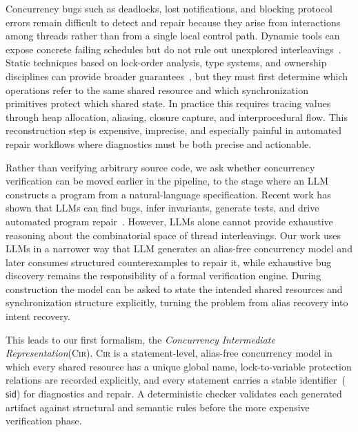 \documentclass{article}
\begin{document}
Concurrency bugs such as deadlocks, lost notifications, and blocking protocol errors remain difficult to detect and repair because they arise from interactions among threads rather than from a single local control path. Dynamic tools can expose concrete failing schedules but do not rule out unexplored interleavings~\cite{Godefroid1997VeriSoft,Flanagan2005DPOR,Musuvathi2008Heisenbugs,Burckhardt2010RandomizedScheduler}. Static techniques based on lock-order analysis, type systems, and ownership disciplines can provide broader guarantees~\cite{Engler2003RacerX,Flanagan2000TypeBasedRace,Flanagan2003Atomicity,Boyapati2002Ownership,Pratikakis2006Locksmith,Naik2006StaticRaceJava}, but they must first determine which operations refer to the same shared resource and which synchronization primitives protect which shared state. In practice this requires tracing values through heap allocation, aliasing, closure capture, and interprocedural flow. This reconstruction step is expensive, imprecise, and especially painful in automated repair workflows where diagnostics must be both precise and actionable.

Rather than verifying arbitrary source code, we ask whether concurrency verification can be moved earlier in the pipeline, to the stage where an LLM constructs a program from a natural-language specification. Recent work has shown that LLMs can find bugs, infer invariants, generate tests, and drive automated program repair~\cite{Chen2021CodeLLMs,Fan2023RepairFromLLMs,Xia2023APRLLMs,Bouzenia2025RepairAgent,Li2025ContextAwarePrompting}. However, LLMs alone cannot provide exhaustive reasoning about the combinatorial space of thread interleavings. Our work uses LLMs in a narrower way that LLM generates an alias-free concurrency model and later consumes structured counterexamples to repair it, while exhaustive bug discovery remains the responsibility of a formal verification engine. During construction the model can be asked to state the intended shared resources and synchronization structure explicitly, turning the problem from alias recovery into intent recovery.

This leads to our first formalism, the \emph{Concurrency Intermediate Representation}(\textsc{Cir}). \textsc{Cir} is a statement-level, alias-free concurrency model in which every shared resource has a unique global name, lock-to-variable protection relations are recorded explicitly, and every statement carries a stable identifier~($\mathsf{sid}$) for diagnostics and repair. A deterministic checker validates each generated artifact against structural and semantic rules before the more expensive verification phase.
\end{document}
